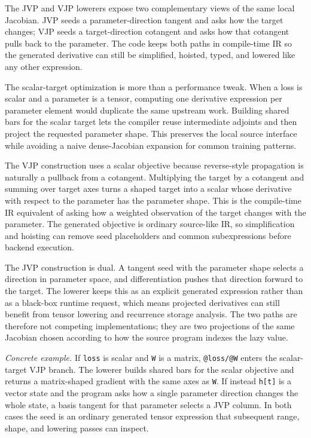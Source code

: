 The JVP and VJP lowerers expose two complementary views of the same local
Jacobian. JVP seeds a parameter-direction tangent and asks how the target
changes; VJP seeds a target-direction cotangent and asks how that cotangent
pulls back to the parameter. The code keeps both paths in compile-time IR so
the generated derivative can still be simplified, hoisted, typed, and lowered
like any other expression.

The scalar-target optimization is more than a performance tweak. When a loss is
scalar and a parameter is a tensor, computing one derivative expression per
parameter element would duplicate the same upstream work. Building shared bars
for the scalar target lets the compiler reuse intermediate adjoints and then
project the requested parameter shape. This preserves the local source
interface while avoiding a naive dense-Jacobian expansion for common training
patterns.

The VJP construction uses a scalar objective because reverse-style propagation
is naturally a pullback from a cotangent. Multiplying the target by a cotangent
and summing over target axes turns a shaped target into a scalar whose
derivative with respect to the parameter has the parameter shape. This is the
compile-time IR equivalent of asking how a weighted observation of the target
changes with the parameter. The generated objective is ordinary source-like IR,
so simplification and hoisting can remove seed placeholders and common
subexpressions before backend execution.

The JVP construction is dual. A tangent seed with the parameter shape selects a
direction in parameter space, and differentiation pushes that direction forward
to the target. The lowerer keeps this as an explicit generated expression rather
than as a black-box runtime request, which means projected derivatives can still
benefit from tensor lowering and recurrence storage analysis. The two paths are
therefore not competing implementations; they are two projections of the same
Jacobian chosen according to how the source program indexes the lazy value.

\textit{Concrete example.} If \texttt{loss} is scalar and \texttt{W} is a
matrix, \texttt{@loss/@W} enters the scalar-target VJP branch. The lowerer
builds shared bars for the scalar objective and returns a matrix-shaped
gradient with the same axes as \texttt{W}. If instead \texttt{h[t]} is a vector
state and the program asks how a single parameter direction changes the whole
state, a basis tangent for that parameter selects a JVP column. In both cases
the seed is an ordinary generated tensor expression that subsequent range,
shape, and lowering passes can inspect.

